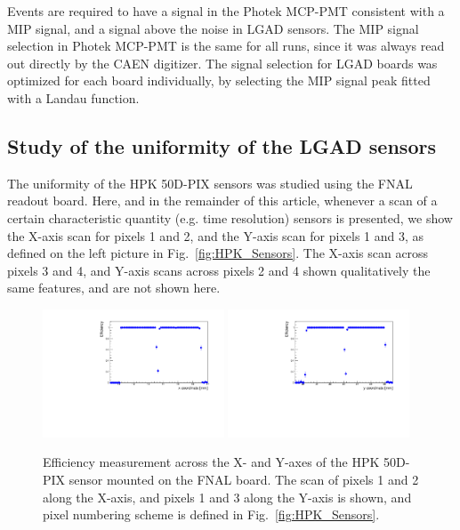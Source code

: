 \documentclass[preprint,1p]{elsarticle}
\begin{document}
Events are required to have a signal in the Photek MCP-PMT consistent with a MIP
signal, and a signal above the noise in LGAD sensors. The MIP signal selection
in Photek MCP-PMT is the same for all runs, since it was always read out
directly by the CAEN digitizer. The signal selection for LGAD boards was
optimized for each board individually, by selecting the MIP signal peak fitted
with a Landau function. 


\subsection{Study of the uniformity of the LGAD sensors}

The uniformity of the HPK 50D-PIX sensors was studied using the FNAL readout
board. Here, and in the remainder of this article, whenever a scan of a certain
characteristic quantity (e.g. time resolution) sensors is presented, we show the
X-axis scan for pixels 1 and 2, and the Y-axis scan for pixels 1 and 3, as
defined on the left picture in Fig.~\ref{fig:HPK_Sensors}. The X-axis scan
across pixels 3 and 4, and Y-axis scans across pixels 2 and 4 shown
qualitatively the same features, and are not shown here. 

\begin{figure}[htbp] 
\centering
\includegraphics[width=0.48\textwidth]{figs/FNALBoard_HPK50DPix_Run847-891/Eff_vs_X_Ch4_5.pdf} 
\includegraphics[width=0.48\textwidth]{figs/FNALBoard_HPK50DPix_Run847-891/Eff_vs_Y_Ch3_4.pdf} 
\caption{Efficiency measurement across the X- and Y-axes of the HPK 50D-PIX sensor mounted on the FNAL board. The scan of pixels 1 and 2 along the X-axis, and pixels 1 and 3 along the Y-axis is shown, and pixel numbering scheme is defined in Fig.~\ref{fig:HPK_Sensors}.} 
\label{fig:FNAL_HPK50_effXY} 
\end{figure} 
\end{document}
